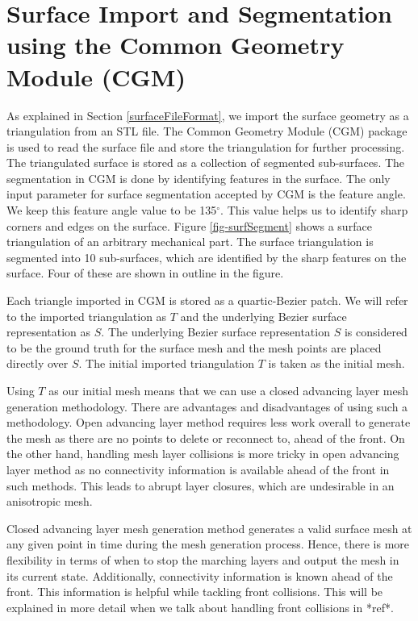 \section{Surface Import and Segmentation using the Common Geometry Module (CGM)}

As explained in Section \ref{surfaceFileFormat}, we import the surface geometry as a triangulation from an STL file. The Common Geometry Module (CGM) package is used to read the surface file and store the triangulation for further processing. The triangulated surface is stored as a collection of segmented sub-surfaces. The segmentation in CGM is done by identifying features in the surface. The only input parameter for surface segmentation accepted by CGM is the feature angle. We keep this feature angle value to be 135{$^\circ{}$}. This value helps us to identify sharp corners and edges on the surface. Figure \ref{fig-surfSegment} shows a surface triangulation of an arbitrary mechanical part. The surface triangulation is segmented into 10 sub-surfaces, which are identified by the sharp features on the surface. Four of these are shown in outline in the figure.

Each triangle imported in CGM is stored as a quartic-Bezier patch. We will refer to the imported triangulation as $T$ and the underlying Bezier surface representation as $S$. The underlying Bezier surface representation $S$ is considered to be the ground truth for the surface mesh and the mesh points are placed directly over $S$. The initial imported triangulation $T$ is taken as the initial mesh. 

Using $T$ as our initial mesh means that we can use a closed advancing layer mesh generation methodology. There are advantages and disadvantages of using such a methodology. Open advancing layer method requires less work overall to generate the mesh as there are no points to delete or reconnect to, ahead of the front. On the other hand, handling mesh layer collisions is  more tricky in open advancing layer method as no connectivity information is available ahead of the front in such methods. This leads to abrupt layer closures, which are undesirable in an anisotropic mesh.

Closed advancing layer mesh generation method generates a valid surface mesh at any given point in time during the mesh generation process. Hence, there is more flexibility in terms of when to stop the marching layers and output the mesh in its current state. Additionally, connectivity information is known ahead of the front. This information is helpful while tackling front collisions. This will be explained in more detail when we talk about handling front collisions in *ref*.

